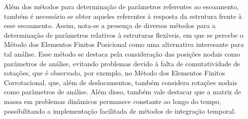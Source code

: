\documentclass[_ArquivoPrincipal.tex]{subfiles}
\begin{document}
Além dos métodos para determinação de parâmetros referentes ao escoamento, também é necessário se obter aqueles referentes à resposta da estrutura frente à esse escoamento. Assim, nota-se a presença de diversos métodos para a determinação de parâmetros relativos à estruturas flexíveis, em que se percebe o Método dos Elementos Finitos Posicional como uma alternativa interesante para tal análise. Esse método se destaca pela consideração das posições nodais como parâmetros de análise, evitando problemas devido à falta de comutatividade de rotações, que é observado, por exemplo, no Método dos Elementos Finitos Corrotacional, que, além de deslocamentos, também considera rotações nodais como parâmetros de análise. Além disso, também vale destacar que a matriz de massa em problemas dinâmicos permanece constante ao longo do tempo, possibilitando a implementação facilitada de métodos de integração temporal.
\end{document}
